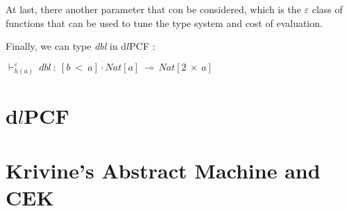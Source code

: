 \documentclass[a4paper,12pt]{report}
\begin{document}
At last, there another parameter that con be considered, which is the $\varepsilon$
class of functions that can be used to tune the type system and cost of
evaluation.

Finally, we can type \emph{dbl} in d$l$PCF :

\begin{center}
$\vdash^{\varepsilon}_{h(a)}~dbl~:~[b~<~a] \cdot Nat[a]~\multimap~Nat[2~\times~a]$
\end{center}

\section{d$l$PCF}



\section{Krivine's Abstract Machine and CEK}
\end{document}
